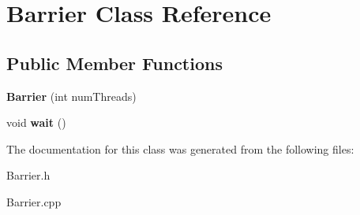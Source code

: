 \hypertarget{classBarrier}{}\section{Barrier Class Reference}
\label{classBarrier}
\subsection*{Public Member Functions}
\begin{DoxyCompactItemize}
\item 
\mbox{\label{classBarrier_a7290fb8952d0f7779b8d6a7a34bbd407}} 
{\bfseries Barrier} (int num\+Threads)
\item 
\mbox{\label{classBarrier_a83a9d2e85e98b3d2081538bf0da29b60}} 
void {\bfseries wait} ()
\end{DoxyCompactItemize}


The documentation for this class was generated from the following files\+:\begin{DoxyCompactItemize}
\item 
Barrier.\+h\item 
Barrier.\+cpp\end{DoxyCompactItemize}
